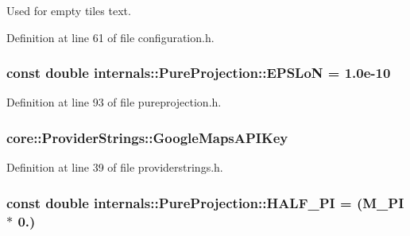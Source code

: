 \-Used for empty tiles text. 



\-Definition at line 61 of file configuration.\-h.

\hypertarget{group___o_p_map_widget_ga48583ac82eb87f081f2dc32a9ab39349}{
\subsubsection[{\-E\-P\-S\-Lo\-N}]{\setlength{\rightskip}{0pt plus 5cm}const double {\bf internals\-::\-Pure\-Projection\-::\-E\-P\-S\-Lo\-N} = 1.\-0e-\/10}}\label{group___o_p_map_widget_ga48583ac82eb87f081f2dc32a9ab39349}


\-Definition at line 93 of file pureprojection.\-h.

\hypertarget{group___o_p_map_widget_ga4a655ecac5457e2a580ee2c9b7743441}{
\subsubsection[{\-Google\-Maps\-A\-P\-I\-Key}]{ {\bf core\-::\-Provider\-Strings\-::\-Google\-Maps\-A\-P\-I\-Key}}}\label{group___o_p_map_widget_ga4a655ecac5457e2a580ee2c9b7743441}


\-Definition at line 39 of file providerstrings.\-h.

\hypertarget{group___o_p_map_widget_ga767800d1664d3a7d0255a1d1d55bea69}{
\subsubsection[{\-H\-A\-L\-F\-\_\-\-P\-I}]{\setlength{\rightskip}{0pt plus 5cm}const double {\bf internals\-::\-Pure\-Projection\-::\-H\-A\-L\-F\-\_\-\-P\-I} = (\-M\-\_\-\-P\-I $\ast$ 0.)}}\label{group___o_p_map_widget_ga767800d1664d3a7d0255a1d1d55bea69}


